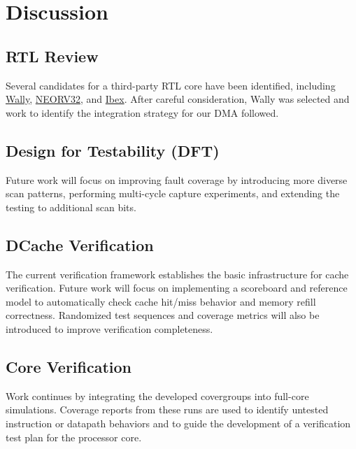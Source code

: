\documentclass[conference]{IEEEtran}
\begin{document}
\section{Discussion} %

\subsection{RTL Review}
Several candidates for a third-party RTL core have been identified, including \href{https://github.com/openhwgroup/cvw}{Wally}, \href{https://github.com/stnolting/neorv32}{NEORV32}, and \href{https://github.com/lowRISC/ibex}{Ibex}. After careful consideration, Wally was selected and work to identify the integration strategy for our DMA followed.

\subsection{Design for Testability (DFT)}
Future work will focus on improving fault coverage by introducing more diverse scan patterns, performing multi-cycle capture experiments, and extending the testing to additional scan bits. 

\subsection{DCache Verification}
The current verification framework establishes the basic infrastructure for cache verification. Future work will focus on implementing a scoreboard and reference model to automatically check cache hit/miss behavior and memory refill correctness. Randomized test sequences and coverage metrics will also be introduced to improve verification completeness.

\subsection{Core Verification}
Work continues by integrating the developed covergroups into full-core simulations. Coverage reports from these runs are used to identify untested instruction or datapath behaviors and to guide the development of a verification test plan for the processor core.
\end{document}
